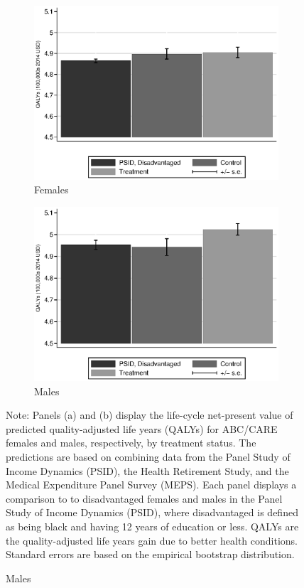 \begin{figure}[!htbp]
\centering
\caption{Quality Adjusted Life Years, Predictions and Comparison to PSID}\label{fig:qalys}
\begin{subfigure}[h]{0.4\textwidth}
		\centering
		\caption{Females} \label{fig:qabcare1}
		\includegraphics[width=\textwidth]{output/qalyexppsid_0.eps}
\end{subfigure}%
\begin{subfigure}[h]{0.4\textwidth}
	\centering
	\caption{Males} \label{fig:qpsid1}
		\includegraphics[width=\textwidth]{output/qalyexppsid_1.eps}
\end{subfigure}
\footnotesize \justify
Note: Panels (a) and (b) display the life-cycle net-present value of predicted quality-adjusted life years (QALYs) for ABC/CARE females and males, respectively, by treatment status. The predictions are based on combining data from the Panel Study of Income Dynamics (PSID), the Health Retirement Study, and the Medical Expenditure Panel Survey (MEPS). Each panel displays a comparison to to disadvantaged females and males in the Panel Study of Income Dynamics (PSID), where disadvantaged is defined as being black and having 12 years of education or less. QALYs are the quality-adjusted life years gain due to better health conditions. Standard errors are based on the empirical bootstrap distribution.\\
\end{figure}

